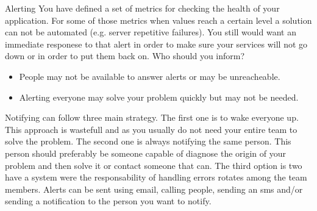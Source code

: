 \begin{pattern}{Alerting} \label{chap:patterns:pattern:alerting}
    \context
        You have defined a set of metrics for checking the health of your application. For some of those metrics when values reach a certain level a solution can not be automated (e.g. server repetitive failures).
        You still would want an immediate responese to that alert in order to make sure your services will not go down or in order to put them back on.
    \problem
        Who should you inform?
    \forces
        \begin{itemize}
            \item People may not be available to answer alerts or may be unreacheable.
            \item Alerting everyone may solve your problem quickly but may not be needed.
        \end{itemize}
    \solution
        Notifying can follow three main strategy.
        The first one is to wake everyone up. This approach is wastefull and as you usually do not need your entire team to solve the problem.
        The second one is always notifying the same person. This person should preferably be someone capable of diagnose the origin of your problem and then solve it or contact someone that can.
        The third option is two have a system were the responsability of handling errors rotates among the team members.
        Alerts can be sent using email, calling people, sending an sms and/or sending a notification to the person you want to notify.
\end{pattern}



